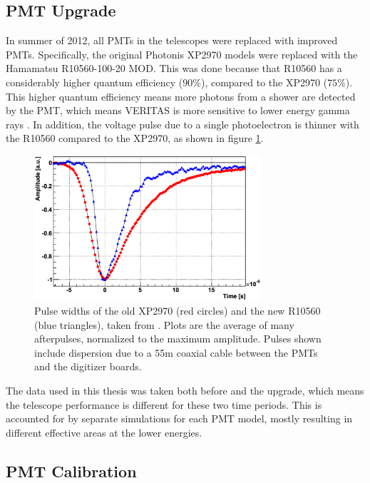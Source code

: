 \subsection{PMT Upgrade}
In summer of 2012, all PMTs in the telescopes were replaced with improved PMTs.
Specifically, the original Photonis XP2970 models were replaced with the Hamamatsu R10560-100-20 MOD.
This was done because that R10560 has a considerably higher quantum efficiency (\nicetilde$90\%$), compared to the XP2970 (\nicetilde$75\%$).
This higher quantum efficiency means more photons from a shower are detected by the PMT, which means VERITAS is more sensitive to lower energy gamma rays \cite{pmtmodels}.
In addition, the voltage pulse due to a single photoelectron is thinner with the R10560 compared to the XP2970, as shown in figure \ref{fig:pmt_pulse_widths}.

\begin{figure}[ht]
  \begin{center}
    \includegraphics[width=0.75\textwidth]{images/pmt_models_pulsewidths.eps}
    \caption[Pulse Widths]{Pulse widths of the old XP2970 (red circles) and the new R10560 (blue triangles), taken from \cite{pmtmodels}.  Plots are the average of many afterpulses, normalized to the maximum amplitude.  Pulses shown include dispersion due to a \nicetilde55m coaxial cable between the PMTs and the digitizer boards.}\label{fig:pmt_pulse_widths}
  \end{center}
\end{figure}

The data used in this thesis was taken both before and the upgrade, which means the telescope performance is different for these two time periods.
This is accounted for by separate simulations for each PMT model, mostly resulting in different effective areas at the lower energies.


\subsection{PMT Calibration}

